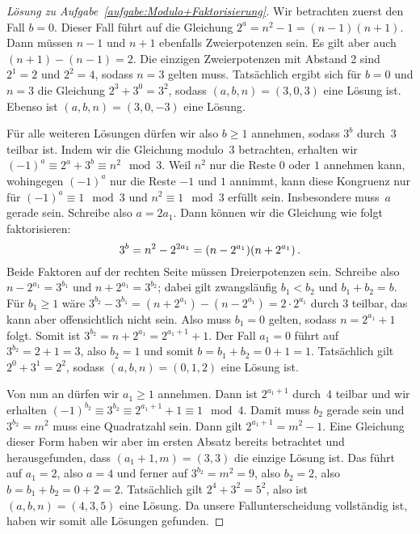 \begin{proof}[Lösung zu Aufgabe~\ref{aufgabe:Modulo+Faktorisierung}]
	Wir betrachten zuerst den Fall $b=0$. Dieser Fall führt auf die Gleichung $2^a=n^2-1=(n-1)(n+1)$. Dann müssen $n-1$ und $n+1$ ebenfalls Zweierpotenzen sein. Es gilt aber auch $(n+1)-(n-1)=2$. Die einzigen Zweierpotenzen mit Abstand 2 sind $2^1=2$ und $2^2=4$, sodass $n=3$ gelten muss. Tatsächlich ergibt sich für $b=0$ und $n=3$ die Gleichung $2^3+3^0=3^2$, sodass $(a,b,n)=(3,0,3)$ eine Lösung ist. Ebenso ist $(a,b,n)=(3,0,-3)$ eine Lösung.
	
	Für alle weiteren Lösungen dürfen wir also $b\geqslant 1$ annehmen, sodass $3^b$ durch~$3$ teilbar ist. Indem wir die Gleichung modulo~$3$ betrachten, erhalten wir $(-1)^a\equiv 2^a+3^b\equiv n^2\mod 3$. Weil $n^2$ nur die Reste $0$ oder $1$ annehmen kann, wohingegen $(-1)^a$ nur die Reste $-1$ und $1$ annimmt, kann diese Kongruenz nur für $(-1)^a\equiv 1\mod 3$ und $n^2\equiv 1\mod 3$ erfüllt sein. Insbesondere muss~$a$ gerade sein. Schreibe also $a=2a_1$. Dann können wir die Gleichung wie folgt faktorisieren:
	\begin{equation*}
		3^b=n^2-2^{2a_1}=\parens*{n-2^{a_1}}\parens*{n+2^{a_1}}\,.
	\end{equation*}
	Beide Faktoren auf der rechten Seite müssen Dreierpotenzen sein. Schreibe also $n-2^{a_1}=3^{b_1}$ und $n+2^{a_1}=3^{b_2}$; dabei gilt zwangsläufig $b_1<b_2$ und $b_1+b_2=b$. Für $b_1\geqslant 1$ wäre $3^{b_2}-3^{b_1}=(n+2^{a_1})-(n-2^{a_1})=2\cdot 2^{a_1}$ durch $3$ teilbar, das kann aber offensichtlich nicht sein. Also muss $b_1=0$ gelten, sodass $n=2^{a_1}+1$ folgt. Somit ist $3^{b_2}=n+2^{a_1}=2^{a_1+1}+1$. Der Fall $a_1=0$ führt auf $3^{b_2}=2+1=3$, also $b_2=1$ und somit $b=b_1+b_2=0+1=1$. Tatsächlich gilt $2^0+3^1=2^2$, sodass $(a,b,n)=(0,1,2)$ eine Lösung ist.
	
	Von nun an dürfen wir $a_1\geqslant 1$ annehmen. Dann ist $2^{a_1+1}$ durch~$4$ teilbar und wir erhalten $(-1)^{b_2}\equiv 3^{b_2}\equiv 2^{a_1+1}+1\equiv 1\mod 4$. Damit muss $b_2$ gerade sein und $3^{b_2}=m^2$ muss eine Quadratzahl sein. Dann gilt $2^{a_1+1}=m^2-1$. Eine Gleichung dieser Form haben wir aber im ersten Absatz bereits betrachtet und herausgefunden, dass $(a_1+1,m)=(3,3)$ die einzige Lösung ist. Das führt auf $a_1=2$, also $a=4$ und ferner auf $3^{b_2}=m^2=9$, also $b_2=2$, also $b=b_1+b_2=0+2=2$. Tatsächlich gilt $2^4+3^2=5^2$, also ist $(a,b,n)=(4,3,5)$ eine Lösung. Da unsere Fallunterscheidung vollständig ist, haben wir somit alle Lösungen gefunden.
\end{proof}

